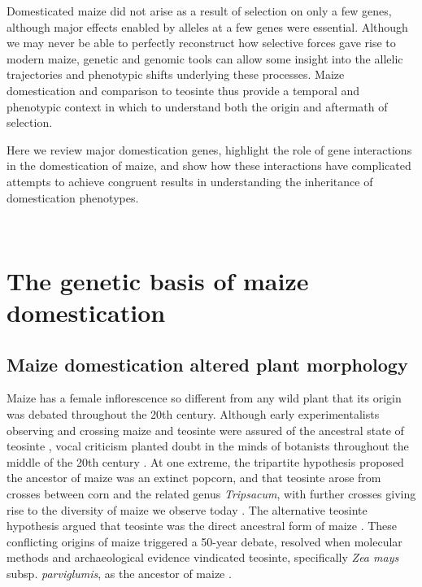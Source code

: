 \documentclass[9pt,twocolumn,twoside]{rilabRxiv}
\begin{document}
﻿Domesticated maize did not arise as a result of selection on only a few genes, although major effects enabled by alleles at a few genes were essential.
Although we may never be able to perfectly reconstruct how selective forces gave rise to modern maize, genetic and genomic tools can allow some insight into the allelic trajectories and phenotypic shifts underlying these processes.
Maize domestication and comparison to teosinte thus provide a temporal and phenotypic context in which to understand both the origin and aftermath of selection.

﻿Here we review major domestication genes, highlight the role of gene interactions in the domestication of maize, and show how these interactions have complicated attempts to achieve congruent results in understanding the inheritance of domestication phenotypes.

﻿\section*{The genetic basis of maize domestication}

\subsection*{Maize domestication altered plant morphology}

﻿Maize has a female inflorescence so different from any wild plant that its origin was debated throughout the 20th century.
Although early experimentalists observing and crossing maize and teosinte were assured of the ancestral state of teosinte \citep{harshberger1896, collins1920, weatherwax1924}, %
﻿vocal criticism planted doubt in the minds of botanists throughout the middle of the 20th century \citep{mangelsdorf1939, mangelsdorf1974}.
﻿At one extreme, the tripartite hypothesis proposed the ancestor of maize was an extinct popcorn, and that teosinte arose from crosses between corn and the related genus \textit{Tripsacum}, with further crosses giving rise to the diversity of maize we observe today \citep{mangelsdorf1939}.
﻿The alternative teosinte hypothesis argued that teosinte was the direct ancestral form of maize \citep{beadle1939}.
﻿These conflicting origins of maize triggered a 50-year debate, resolved when molecular methods and archaeological evidence vindicated teosinte, specifically \textit{Zea mays} subsp. \textit{parviglumis}, as the ancestor of maize \citep{matsuoka2002, piperno2009, bennetzen2001}.
\end{document}
